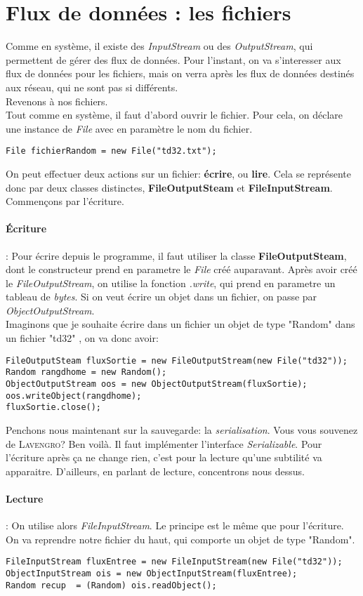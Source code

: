 \documentclass{article}
\begin{document}
\section{Flux de données : les fichiers}
Comme en système, il existe des \emph{InputStream} ou des \emph{OutputStream}, qui permettent de gérer des flux de données. Pour l'instant, on va s'interesser aux flux de données pour les fichiers, mais on verra après les flux de données destinés aux réseau, qui ne sont pas si différents.\\
Revenons à nos fichiers. \\
Tout comme en système, il faut d'abord ouvrir le fichier. Pour cela, on déclare une instance de \emph{File} avec en paramètre le nom du fichier.
\begin{lstlisting}
File fichierRandom = new File("td32.txt");
\end{lstlisting}
On peut effectuer deux actions sur un fichier: \textbf{écrire}, ou \textbf{lire}. Cela se représente donc par deux classes distinctes, \textbf{FileOutputSteam} et \textbf{FileInputStream}.\\
Commençons par l'écriture.
\paragraph{Écriture} : Pour écrire depuis le programme, il faut utiliser la classe \textbf{FileOutputSteam}, dont le constructeur prend en parametre le \emph{File} créé auparavant. Après avoir créé le \emph{FileOutputStream}, on utilise la fonction \emph{.write}, qui prend en parametre un tableau de \emph{bytes}. Si on veut écrire un objet dans un fichier,  on passe par  \emph{ObjectOutputStream}.\\
Imaginons que je souhaite écrire dans un fichier un objet de type "Random" dans un fichier "td32" , on va donc avoir:
\begin{lstlisting}
FileOutputSteam fluxSortie = new FileOutputStream(new File("td32"));
Random rangdhome = new Random();
ObjectOutputStream oos = new ObjectOutputStream(fluxSortie);
oos.writeObject(rangdhome);
fluxSortie.close();
\end{lstlisting}
Penchons nous maintenant sur la sauvegarde: la \emph{serialisation}. Vous vous souvenez de \textsc{Lavengro}? Ben voilà. Il faut implémenter l'interface \emph{Serializable}. Pour l'écriture après ça ne change rien, c'est pour la lecture qu'une subtilité va apparaitre. D'ailleurs, en parlant de lecture, concentrons nous dessus.
\paragraph{Lecture} : On utilise alors \emph{FileInputStream}. Le principe est le même que pour l'écriture. On va reprendre notre fichier du haut, qui comporte un objet de type "Random". 
\begin{lstlisting}
FileInputStream fluxEntree = new FileInputStream(new File("td32"));
ObjectInputStream ois = new ObjectInputStream(fluxEntree);
Random recup  = (Random) ois.readObject();
\end{lstlisting}
\end{document}
